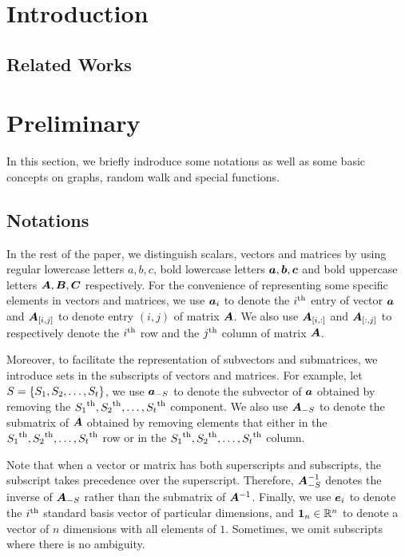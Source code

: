 \documentclass[sigconf]{acmart}
\begin{document}
\section{Introduction}
\subsection{Related Works}

\section{Preliminary}

In this section, we briefly indroduce some notations as well as some basic concepts on graphs, random walk and special functions.

\subsection{Notations}

In the rest of the paper, we distinguish scalars, vectors and matrices by using regular lowercase letters \(a,b,c\), bold lowercase letters \(\boldsymbol{a},\boldsymbol{b},\boldsymbol{c}\) and bold uppercase letters \(\boldsymbol{A},\boldsymbol{B},\boldsymbol{C}\) respectively. For the convenience of representing some specific elements in vectors and matrices, we use \(\boldsymbol{a}_{i}\) to denote the \({i}^{\rm{th}}\) entry of vector \(\boldsymbol{a}\) and \(\boldsymbol{A}_{[i,j]}\) to denote entry \((i,j)\) of matrix \(\boldsymbol{A}\). We also use \(\boldsymbol{A}_{[i,:]}\) and \(\boldsymbol{A}_{[:,j]}\) to respectively denote the \({i}^{\rm{th}}\) row and the \({j}^{\rm{th}}\) column of matrix \(\boldsymbol{A}\).

Moreover, to facilitate the representation of subvectors and submatrices, we introduce sets in the subscripts of vectors and matrices. For example, let \(S=\left\{S_1,S_2,\dots,S_t \right\}\), we use \(\boldsymbol{a}_{-S}\) to denote the subvector of \(\boldsymbol{a}\) obtained by removing the \({S_1}^{\rm{th}},{S_2}^{\rm{th}},\dots,{S_t}^{\rm{th}}\) component. We also use \(\boldsymbol{A}_{-S}\) to denote the submatrix of \(\boldsymbol{A}\) obtained by removing elements that either in the \({S_1}^{\rm{th}},{S_2}^{\rm{th}},\dots,{S_t}^{\rm{th}}\) row or in the \({S_1}^{\rm{th}},{S_2}^{\rm{th}},\dots,{S_t}^{\rm{th}}\) column.

Note that when a vector or matrix has both superscripts and subscripts, the subscript takes precedence over the superscript. Therefore, \(\boldsymbol{A}_{-S}^{-1}\) denotes the inverse of \(\boldsymbol{A}_{-S}\) rather than the submatrix of \(\boldsymbol{A}^{-1}\). Finally, we use \(\boldsymbol{e}_i\) to denote the \({i}^{\rm{th}}\) standard basis vector of particular dimensions, and \(\boldsymbol{1}_n\in \mathbb{R}^n\) to denote a vector of \(n\) dimensions with all elements of \(1\). Sometimes, we omit subscripts where there is no ambiguity.
\end{document}
